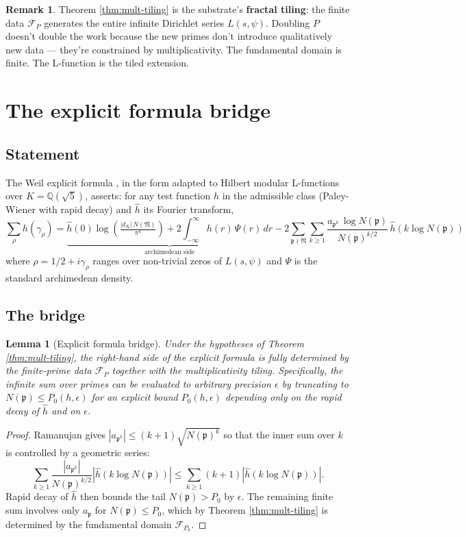 \documentclass[11pt,a4paper]{article}
\newtheorem{lemma}[theorem]{Lemma}
\theoremstyle{definition}
\newtheorem{remark}[theorem]{Remark}
\newcommand{\Q}{\mathbb{Q}}
\begin{document}
\begin{remark}\label{rem:tiling}
Theorem \ref{thm:mult-tiling} is the substrate's \textbf{fractal tiling}: the
finite data $\mathcal{F}_P$ generates the entire infinite Dirichlet series
$L(s,\psi)$. Doubling $P$ doesn't double the work because the new primes don't
introduce qualitatively new data --- they're constrained by multiplicativity.
The fundamental domain is finite. The L-function is the tiled extension.
\end{remark}

\section{The explicit formula bridge}

\subsection{Statement}
The Weil explicit formula \cite{Weil}, in the form adapted to Hilbert modular
L-functions over $K=\Q(\sqrt{5})$, asserts: for any test function $h$ in the
admissible class (Paley-Wiener with rapid decay) and $\hat h$ its Fourier
transform,
$$
\sum_{\rho} h(\gamma_\rho) =
\underbrace{\hat h(0) \log\!\left(\tfrac{|d_K|\,N(\mathfrak{N})}{\pi^4}\right)
 + 2 \int_{-\infty}^{\infty} h(r) \,\Psi(r)\,dr}_{\text{archimedean side}}
 - 2\sum_{\mathfrak{p}\nmid\mathfrak{N}}
       \sum_{k\ge 1}
       \frac{a_{\mathfrak{p}^k}\,\log N(\mathfrak{p})}{N(\mathfrak{p})^{k/2}}
       \,\hat h(k\log N(\mathfrak{p}))
$$
where $\rho = 1/2 + i\gamma_\rho$ ranges over non-trivial zeros of $L(s,\psi)$
and $\Psi$ is the standard archimedean density.

\subsection{The bridge}
\begin{lemma}[Explicit formula bridge]\label{lem:bridge}
Under the hypotheses of Theorem \ref{thm:mult-tiling}, the right-hand side of
the explicit formula is fully determined by the finite-prime data
$\mathcal{F}_P$ together with the multiplicativity tiling. Specifically, the
infinite sum over primes can be evaluated to arbitrary precision $\epsilon$ by
truncating to $N(\mathfrak{p})\le P_0(h,\epsilon)$ for an explicit bound
$P_0(h,\epsilon)$ depending only on the rapid decay of $\hat h$ and on
$\epsilon$.
\end{lemma}

\begin{proof}
Ramanujan gives $|a_{\mathfrak{p}^k}|\le (k+1)\sqrt{N(\mathfrak{p})^k}$ so that
the inner sum over $k$ is controlled by a geometric series:
$$
\sum_{k\ge 1}\frac{|a_{\mathfrak{p}^k}|}{N(\mathfrak{p})^{k/2}}|\hat h(k\log N(\mathfrak{p}))|
\le \sum_{k\ge 1}(k+1)|\hat h(k\log N(\mathfrak{p}))|.
$$
Rapid decay of $\hat h$ then bounds the tail $N(\mathfrak{p})>P_0$ by
$\epsilon$. The remaining finite sum involves only $a_\mathfrak{p}$ for
$N(\mathfrak{p})\le P_0$, which by Theorem \ref{thm:mult-tiling} is determined
by the fundamental domain $\mathcal{F}_{P_0}$.
\end{proof}
\end{document}
